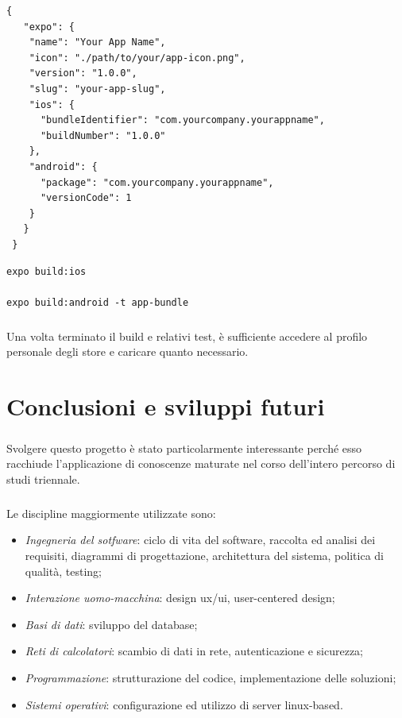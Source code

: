 \documentclass[12pt,a4paper,twoside,english,italian]{book}
\begin{document}
\begin{lstlisting}[title=Struttura del file di configurazione]
{
   "expo": {
    "name": "Your App Name",
    "icon": "./path/to/your/app-icon.png",
    "version": "1.0.0",
    "slug": "your-app-slug",
    "ios": {
      "bundleIdentifier": "com.yourcompany.yourappname",
      "buildNumber": "1.0.0"
    },
    "android": {
      "package": "com.yourcompany.yourappname",
      "versionCode": 1
    }
   }
 }
\end{lstlisting}

\begin{lstlisting}[title=Comandi per effettuare il build delle due app]
expo build:ios     

expo build:android -t app-bundle
\end{lstlisting}

\paragraph{} Una volta terminato il build e relativi test, è sufficiente accedere al profilo personale degli store e caricare quanto necessario. 



\chapter{Conclusioni e sviluppi futuri}

\paragraph{} Svolgere questo progetto è stato particolarmente interessante perché esso racchiude l'applicazione di conoscenze maturate nel corso dell'intero percorso di studi triennale. 

\paragraph{} Le discipline maggiormente utilizzate sono:
\begin{itemize}
    \item \emph{Ingegneria del sotfware}: ciclo di vita del software, raccolta ed analisi dei requisiti, diagrammi di progettazione, architettura del sistema, politica di qualità, testing;
    \item \emph{Interazione uomo-macchina}: design ux/ui, user-centered design;
    \item \emph{Basi di dati}: sviluppo del database;
    \item \emph{Reti di calcolatori}: scambio di dati in rete, autenticazione e sicurezza;
    \item \emph{Programmazione}: strutturazione del codice, implementazione delle soluzioni;
    \item \emph{Sistemi operativi}: configurazione ed utilizzo di server linux-based.
\end{itemize}
\end{document}
